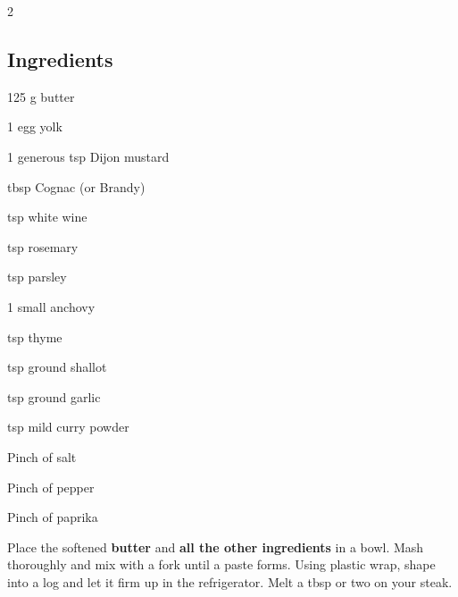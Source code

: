 \newpage
{}

\begin{multicols}{2}
	\subsection*{Ingredients}
	\begin{ingredients}
		\item 125 g butter
		\item 1 egg yolk
		\item 1 generous tsp Dijon mustard
		\item {} tbsp Cognac (or Brandy)
		\item {} tsp white wine
		\item {} tsp rosemary
		\item {} tsp parsley
		\item 1 small anchovy
		\item {} tsp thyme
		\item {} tsp ground shallot
		\item {} tsp ground garlic
		\item {} tsp mild curry powder
		\item Pinch of salt
		\item Pinch of pepper
		\item Pinch of paprika
		
	\end{ingredients}
\end{multicols}

\medskip

Place the softened \textbf{butter} and \textbf{all the other ingredients} in a bowl.
Mash thoroughly and mix with a fork until a paste forms.
Using plastic wrap, shape into a log and let it firm up in the refrigerator. Melt a tbsp or two on your steak. 

\vspace*{0.75 cm}

\begin{recipeblock}
	
\end{recipeblock}
